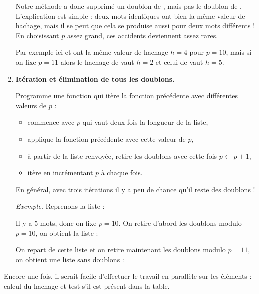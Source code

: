 \documentclass[11pt,class=report,crop=false]{standalone}
\begin{document}
\begin{activite}[Doublons]
\begin{enumerate}
 Notre méthode a donc supprimé un doublon de , mais pas le doublon de . L'explication est simple : deux mots identiques ont bien la même valeur de hachage, mais il se peut que cela se produise aussi pour deux mots différents ! En choisissant $p$ assez grand, ces accidents deviennent assez rares.

Par exemple ici  et  ont la même valeur de hachage $h=4$ pour $p=10$,
mais si on fixe $p=11$ alors le hachage de  vaut $h=2$ et celui de  vaut $h=5$.
  
  
  \item \textbf{Itération et élimination de tous les doublons.}
  
  Programme une fonction  qui itère la fonction précédente avec différentes valeurs de $p$ :
  \begin{itemize}
    \item commence avec $p$ qui vaut deux fois la longueur de la liste,
    \item applique la fonction précédente avec cette valeur de $p$,
    \item à partir de la liste renvoyée, retire les doublons avec cette fois $p\leftarrow p+1$,
    \item itère en incrémentant $p$ à chaque fois.
  \end{itemize}
  
  En général, avec trois itérations il y a peu de chance qu'il reste des doublons !
  
  \emph{Exemple.}
  Reprenons la liste :  
  
  Il y a $5$ mots, donc on fixe $p=10$.
  On retire d'abord les doublons modulo $p=10$, on obtient la liste : 
  
  On repart de cette liste et on retire maintenant les doublons modulo $p=11$, on obtient une liste sans doublons :
  
\end{enumerate}
     
     
Encore une fois, il serait facile d'effectuer le travail en parallèle sur les éléments :
calcul du hachage et test s'il est présent dans la table.

\end{activite}
\end{document}
